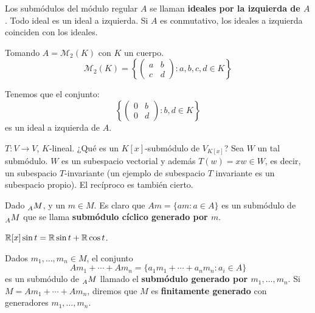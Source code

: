 \begin{ejemplo}
  Los submódulos del módulo regular \(A\) se llaman \textbf{ideales por la izquierda de
    \(A\)}. Todo ideal es un ideal a izquierda. Si \(A\) es conmutativo, los ideales
  a izquierda coinciden con los ideales.

  Tomando \(A=\mathcal{M}_2(K)\) con \(K\) un cuerpo.
  \[
    \mathcal{M}_2(K)=\left\{
      \begin{pmatrix}
        a&b\\
        c&d
      \end{pmatrix}:
      a,b,c,d\in K
    \right\}
  \]

  Tenemos que el conjunto:
  \[
    \left\{
      \begin{pmatrix}
        0&b\\
        0&d
      \end{pmatrix}:
      b,d\in K
    \right\}
  \]
  es un ideal a izquierda de \(A\).
\end{ejemplo}

\begin{ejemplo}
  \(T:V\longrightarrow V\), \(K\)-lineal.
  ¿Qué es un \(K[x]\)-submódulo de \(V_{K[x]}\)?
  Sea \(W\) un tal submódulo.
  \(W\) es un subespacio vectorial y además \(T(w)=xw\in W\),
  es decir, un subespacio \(T\)-invariante (un ejemplo
  de subespacio \(T\) invariante es un subespacio propio).
  El recíproco es también cierto.
\end{ejemplo}

\begin{df}
  Dado \(\prescript{}{A}{M}\), y un \(m\in M\). Es claro que
  \(Am=\{am:a\in A\}\) es un submódulo de \(\prescript{}{A}{M}\) que se llama
  \textbf{submódulo cíclico generado por \(m\)}.
\end{df}

\begin{ejemplo}
  \(\mathbb{R}[x]\sin t=\mathbb{R}\sin t+\mathbb{R}\cos t\).
\end{ejemplo}

\begin{df}
  Dados \(m_1,\ldots, m_n\in M\), el conjunto
  \[
    Am_1+\cdots+Am_n=\{a_1 m_1+\cdots+a_n m_n: a_i\in A\}
  \]
  es un submódulo de \(\prescript{}{A}{M}\) llamado el \textbf{submódulo generado por
  \(m_1,\ldots, m_n\)}.
  Si \(M=Am_1+\cdots+Am_n\), diremos que \(M\) es \textbf{finitamente generado}
  con generadores
  \(m_1,\ldots, m_n\).
\end{df}

